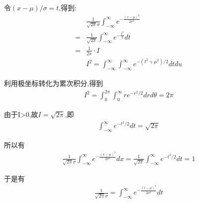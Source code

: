 \documentclass[12pt,a4paper,fontset=none]{ctexart}
\begin{document}
令$(x-\mu)/\sigma=t$,得到:
\begin{align*}
     & \frac{1}{\sqrt{2\pi}\sigma }\int_{-\infty}^{\infty}e^{-\frac{(x-\mu )^2}{2\sigma^2} } \\=&\frac{1}{\sqrt{2\pi}}\int_{-\infty}^{\infty}e^{-\frac{t^2}{2} }dt\\=&\frac{1}{2\pi}\cdot I\\
     & I^2=\int_{-\infty}^{\infty}\int_{-\infty}^{\infty}e^{-(t^2+\mu^2)/2}dtdu
\end{align*}

利用极坐标转化为累次积分,得到
\begin{align*}
    I^2=\int_{0}^{2\pi}\int_{0}^{\infty}re^{-r^2/2}drd\theta=2\pi
\end{align*}

由于I>0,故$I=\sqrt{2\pi}$,即
\begin{align*}
    \int_{-\infty}^{\infty}e^{-t^2/2}dt=\sqrt{2\pi}
\end{align*}

所以有
\begin{align*}
    \frac{1}{\sqrt{2\pi}\sigma }\int_{-\infty}^{\infty}e^{-\frac{(x-\mu )^2}{2\sigma^2} }dx=\frac{1}{\sqrt{2\pi}}\int_{-\infty}^{\infty}e^{-t^2/2}dt=1
\end{align*}

于是有
\begin{align*}
    \frac{1}{\sqrt{2\pi}\sigma }=\int_{-\infty}^{\infty}e^{-\frac{(t-\mu )^2}{2\sigma^2} }dt
\end{align*}
\end{document}
